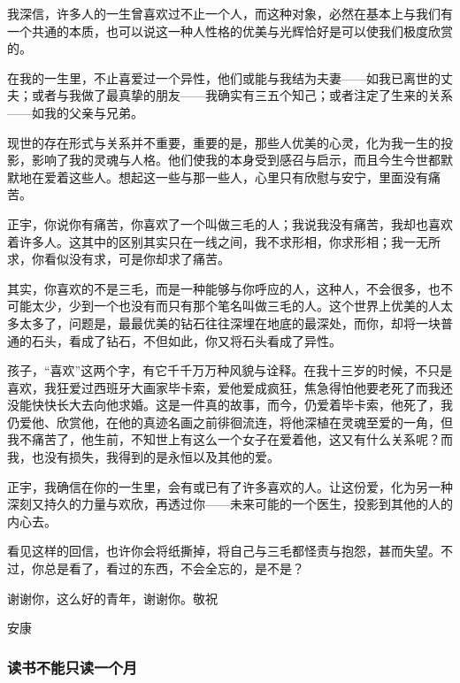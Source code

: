 \par {}
\par 我深信，许多人的一生曾喜欢过不止一个人，而这种对象，必然在基本上与我们有一个共通的本质，也可以说这一种人性格的优美与光辉恰好是可以使我们极度欣赏的。
\par 在我的一生里，不止喜爱过一个异性，他们或能与我结为夫妻——如我已离世的丈夫；或者与我做了最真挚的朋友——我确实有三五个知己；或者注定了生来的关系——如我的父亲与兄弟。
\par 现世的存在形式与关系并不重要，重要的是，那些人优美的心灵，化为我一生的投影，影响了我的灵魂与人格。他们使我的本身受到感召与启示，而且今生今世都默默地在爱着这些人。想起这一些与那一些人，心里只有欣慰与安宁，里面没有痛苦。
\par 正宇，你说你有痛苦，你喜欢了一个叫做三毛的人；我说我没有痛苦，我却也喜欢着许多人。这其中的区别其实只在一线之间，我不求形相，你求形相；我一无所求，你看似没有求，可是你却求了痛苦。
\par 其实，你喜欢的不是三毛，而是一种能够与你呼应的人，这种人，不会很多，也不可能太少，少到一个也没有而只有那个笔名叫做三毛的人。这个世界上优美的人太多太多了，问题是，最最优美的钻石往往深埋在地底的最深处，而你，却将一块普通的石头，看成了钻石，不但如此，你又将石头看成了异性。
\par 孩子，“喜欢”这两个字，有它千千万万种风貌与诠释。在我十三岁的时候，不只是喜欢，我狂爱过西班牙大画家毕卡索，爱他爱成疯狂，焦急得怕他要老死了而我还没能快快长大去向他求婚。这是一件真的故事，而今，仍爱着毕卡索，他死了，我仍爱他、欣赏他，在他的真迹名画之前徘徊流连，将他深植在灵魂至爱的一角，但我不痛苦了，他生前，不知世上有这么一个女子在爱着他，这又有什么关系呢？而我，也没有损失，我得到的是永恒以及其他的爱。
\par 正宇，我确信在你的一生里，会有或已有了许多喜欢的人。让这份爱，化为另一种深刻又持久的力量与欢欣，再透过你——未来可能的一个医生，投影到其他的人的内心去。
\par 看见这样的回信，也许你会将纸撕掉，将自己与三毛都怪责与抱怨，甚而失望。不过，你总是看了，看过的东西，不会全忘的，是不是？
\par 谢谢你，这么好的青年，谢谢你。敬祝
\par 安康
\par {}
\par {}


\subsubsection{读书不能只读一个月}

